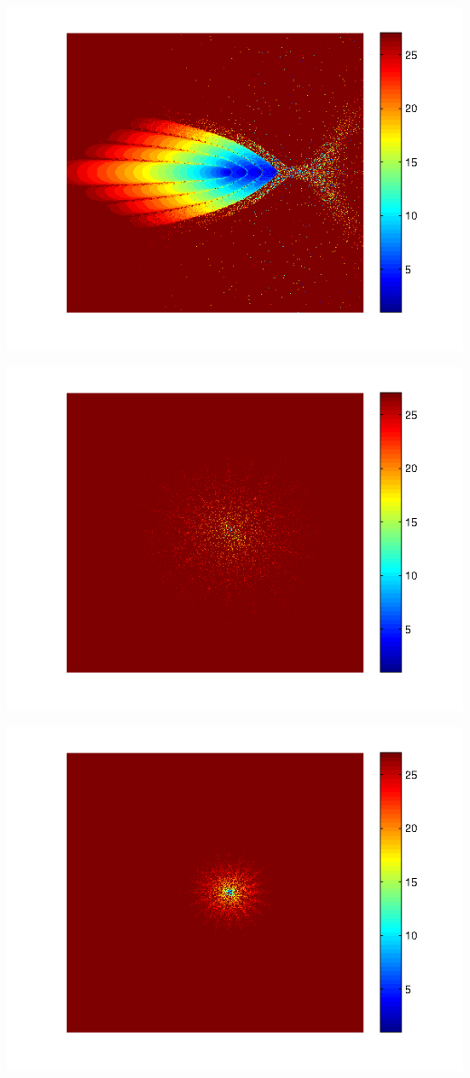 \documentclass{article}
\begin{document}
\includegraphics[scale=0.95]{example3jarrattHigh.jpg}

\includegraphics[scale=0.95]{example4halleyHigh.jpg}

\includegraphics[scale=0.95]{example4jarrattHigh.jpg}
\end{document}
